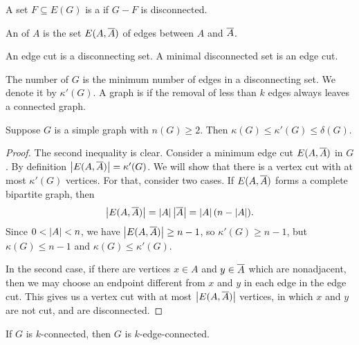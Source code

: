 \begin{definition}
  A set $F \subseteq E(G)$ is a  if $G - F$ is
  disconnected.
\end{definition}

\begin{definition}
  An  of $A$ is the set $E(A, \overline{A})$ of edges between $A$ and
  $\overline{A}$.
\end{definition}

\begin{remark}
  An edge cut is a disconnecting set.
  A minimal disconnected set is an edge cut.
\end{remark}

\begin{definition}
  The  number of $G$ is the minimum number of edges in
  a disconnecting set.
  We denote it by $\kappa'(G)$.
  A graph is  if the removal of less than $k$ edges
  always leaves a connected graph.
\end{definition}

\begin{theorem}
  Suppose $G$ is a simple graph with $n(G) \ge 2$.
  Then $\kappa(G) \le \kappa'(G) \le \delta(G)$.
\end{theorem}

\begin{proof}
  The second inequality is clear.
  Consider a minimum edge cut $E(A, \overline{A})$ in $G$.
  By definition $\left| E(A, \overline{A}) \right| = \kappa'(G)$.
  We will show that there is a vertex cut with at most $\kappa'(G)$ vertices.
  For that, consider two cases.
  If $E(A, \overline{A})$ forms a complete bipartite graph, then
  \[
	\left| E(A, \overline{A}) \right| =
	\left| A \right| \left| \overline{A} \right| = \left| A \right| (n - \left| A \right|).
  \]
  Since $0 < \left| A \right| < n$, we have $\left| E(A, \overline{A}) \right| \ge n-1$, so $\kappa'(G)
  \ge n-1$, but $\kappa(G) \le n-1$ and $\kappa(G) \le \kappa'(G)$.

  In the second case, if there are vertices $x \in A$ and $y \in \overline{A}$ which
  are nonadjacent, then we may choose an endpoint different from $x$ and $y$ in
  each edge in the edge cut.
  This gives us a vertex cut with at most $\left| E(A, \overline{A}) \right|$ vertices, in
  which $x$ and $y$ are not cut, and are disconnected.
\end{proof}

\begin{corollary}
  If $G$ is $k$-connected, then $G$ is $k$-edge-connected.
\end{corollary}

